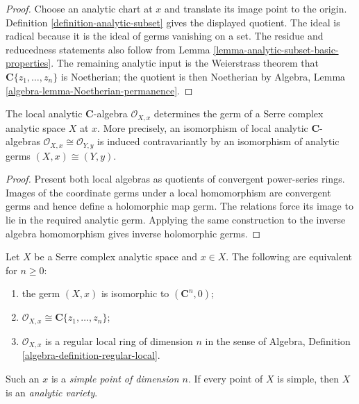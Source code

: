 \begin{proof}
Choose an analytic chart at $x$ and translate its image point to the origin.
Definition \ref{definition-analytic-subset} gives the displayed quotient.
The ideal is radical because it is the ideal of germs vanishing on a set.
The residue and reducedness statements also follow from Lemma
\ref{lemma-analytic-subset-basic-properties}. The remaining analytic input is
the Weierstrass theorem that
$\mathbf C\{z_1,\ldots,z_n\}$ is Noetherian; the quotient is then Noetherian
by Algebra, Lemma \ref{algebra-lemma-Noetherian-permanence}.
\end{proof}

\begin{lemma}
\label{lemma-analytic-germ-local-algebra}
\begin{reference}
\cite[\S 1, no. 4, p. 6]{GAGA}
\end{reference}
The local analytic $\mathbf C$-algebra $\mathcal O_{X,x}$ determines the
germ of a Serre complex analytic space $X$ at $x$. More precisely, an
isomorphism of local analytic $\mathbf C$-algebras
$\mathcal O_{X,x}\cong\mathcal O_{Y,y}$ is induced contravariantly by an
isomorphism of analytic germs $(X,x)\cong(Y,y)$.
\end{lemma}

\begin{proof}
Present both local algebras as quotients of convergent power-series rings.
Images of the coordinate germs under a local homomorphism are convergent
germs and hence define a holomorphic map germ. The relations force its image
to lie in the required analytic germ. Applying the same construction to the
inverse algebra homomorphism gives inverse holomorphic germs.
\end{proof}

\begin{lemma}
\label{lemma-simple-point-regular-local}
\begin{reference}
\cite[\S 1, no. 4, p. 6]{GAGA}
\end{reference}
Let $X$ be a Serre complex analytic space and $x\in X$. The following are
equivalent for $n\geq 0$:
\begin{enumerate}
\item the germ $(X,x)$ is isomorphic to $(\mathbf C^n,0)$;
\item $\mathcal O_{X,x}\cong\mathbf C\{z_1,\ldots,z_n\}$;
\item $\mathcal O_{X,x}$ is a regular local ring of dimension $n$ in the
sense of Algebra, Definition \ref{algebra-definition-regular-local}.
\end{enumerate}
Such an $x$ is a {\it simple point of dimension $n$}. If every point of $X$
is simple, then $X$ is an {\it analytic variety}.
\end{lemma}

